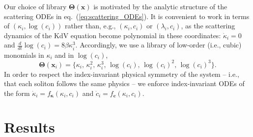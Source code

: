 \documentclass[journal=gmj]{CUP-JNL-DTM}%
\theoremstyle{definition}
\numberwithin{equation}{section}
\begin{document}
Our choice of library $\mathbf{\Theta}(\boldsymbol{x})$ is motivated by the analytic structure of the scattering ODEs in eq.~(\ref{eq:scattering_ODEs}). It is convenient to work in terms of $(\kappa_i,\log(c_i))$ rather than, e.g., $(\kappa_i,c_i)$ or $(\lambda_i, c_i)$, as the scattering dynamics of the KdV equation become polynomial in these coordinates: $\dot\kappa_i=0$ and $\tfrac{d}{dt}\log(c_i) = 8\beta\kappa_i^3$. Accordingly, we use a library of low-order (i.e., cubic) monomials in $\kappa_i$ and in
$\log(c_i)$,
\begin{equation}\label{eq:candidate_library}
    \mathbf{\Theta}(\boldsymbol{x}_i) = \big\{\kappa_i,\, \kappa^2_i,\, \kappa^3_i, \, \log(c_i), \, \log(c_i)^2, \, \log(c_i)^3\big\}.
\end{equation} In order to respect the index-invariant physical symmetry of the system -- i.e., that each soliton follows the same physics -- we enforce index-invariant ODEs of the form $\dot{\kappa}_i = f_{\boldsymbol{\kappa}}(\kappa_i, c_i)$ and $\dot{c}_i = f_{\mathbf{c}}(\kappa_i, c_i)$.


\newpage

\section{Results}\label{sec:results}
\end{document}

